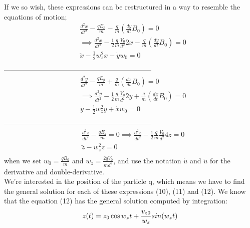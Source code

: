 \documentclass[english,notitlepage,reprint,nofootinbib,twocolumn]{article}
\begin{document}
If we so wish, these expressions can be restructured in a way to resemble the 
equations of motion;
\begin{equation}
    \begin{split}
        & \frac{d^2x}{dt^2} - \frac{qE_x}{m} -  \frac{q}{m}\left(\frac{dy}{dt}B_0 \right) = 0 \\
        & \implies \frac{d^2x}{dt^2} - \frac{1}{2} \frac{q}{m} \frac{V_0}{d^2}2x -  \frac{q}{m}\left(\frac{dy}{dt}B_0 \right) = 0\\                      
        & \ddot{x} - \frac{1}{2} w_z^2x -  \dot{y}w_0 = 0 \\
    \end{split}
\end{equation}
---------------------------------------------------------------
\begin{equation}
    \begin{split}
        &\frac{d^2y}{dt^2} -\frac{qE_y}{m}+\frac{q}{m}\left(\frac{dx}{dt}B_0 \right) = 0 \\
        & \implies \frac{d^2y}{dt^2} -\frac{1}{2}\frac{q}{m}\frac{V_0}{d^2}2y + \frac{q}{m}\left(\frac{dx}{dt}B_0 \right) = 0\\
        & \ddot{y} -\frac{1}{2} w_z^2y + \dot{x}w_0  = 0\\
    \end{split}
\end{equation}
---------------------------------------------------------------
\begin{equation}
    \begin{split}
        & \frac{d^2z}{dt^2} - \frac{qE_z}{m} = 0 \implies \frac{d^2z}{dt^2} -\frac{1}{2}\frac{q}{m}\frac{V_0}{d^2}4z = 0  \\
        & \ddot{z} -w_z^2 z = 0 \\
    \end{split}
\end{equation}
when we set $w_0= \frac{qB_0}{m}$  and $w_z=\frac{2qV_0}{md^2}$, and use the notation $\dot{u}$ and $\ddot{u}$ for the derivative and double-derivative. \\

We're interested in the position of the particle q, which means we have to find the general solution for each of these expressions (10), (11) and (12). We know that the equation (12) has the general solution computed by integration: 
\begin{equation}
    z(t)=z_0\cos{w_zt} + \frac{v_{z0}}{w_z}sin(w_zt) \\
\end{equation}
\end{document}
